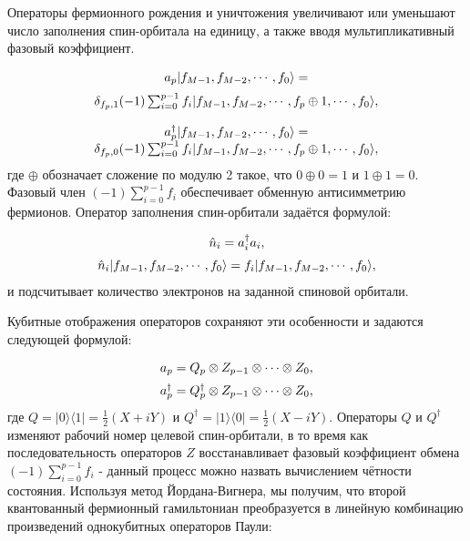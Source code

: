 \documentclass[a4paper]{report}
\begin{document}
Операторы фермионного рождения и уничтожения увеличивают или уменьшают число заполнения спин-орбитала на единицу, а также вводя мультипликативный фазовый коэффициент.

    \begin{equation}\label{}
    \begin{array}{cc}
    \vspace{0,2cm}
    a_p|f_{M-1},f_{M-2},\cdots,f_0\rangle = \\
    \delta_{{f_p},1}(-1)\sum_{i=0}^{p-1}f_i|f_{M-1},f_{M-2},\cdots,f_p\oplus1,\cdots,f_0\rangle, \\
    \\
    a_p^{\dag}|f_{M-1},f_{M-2},\cdots,f_0\rangle = \\
    \delta_{{f_p},0}(-1)\sum_{i=0}^{p-1}f_i|f_{M-1},f_{M-2},\cdots,f_p\oplus1,\cdots,f_0\rangle,
    \nonumber
    \end{array}
    \end{equation}
где ${\oplus}$ обозначает сложение по модулю 2 такое, что ${0\oplus0=1}$ и ${1\oplus1=0}$. Фазовый член ${(-1)\sum_{i=0}^{p-1}f_i}$ обеспечивает обменную антисимметрию фермионов. Оператор заполнения спин-орбитали задаётся формулой:

    \begin{equation}\label{}
    \begin{array}{cc}
    \vspace{0,2cm}
    \hat{n}_i=a_i^{\dag}a_i, \\
    \hat{n}_i|f_{M-1},f_{M-2},\cdots,f_0\rangle=f_i|f_{M-1},f_{M-2},\cdots,f_0\rangle,
    \nonumber
    \end{array}
    \end{equation}
и подсчитывает количество электронов на заданной спиновой орбитали.

Кубитные отображения операторов сохраняют эти особенности и задаются следующей формулой:

    \begin{equation}\label{}
    \begin{array}{cc}
    \vspace{0,2cm}
    a_p=Q_p\otimes Z_{p-1} \otimes \cdots \otimes Z_0, \\
    a_p^{\dag}=Q_p^{\dag} \otimes Z_{p-1} \otimes \cdots \otimes Z_0,
    \nonumber
    \end{array}
    \end{equation}
где ${Q=|0\rangle\langle1|=\frac{1}{2}(X+iY)}$ и ${Q^{\dag}=|1\rangle\langle0|=\frac{1}{2}(X-iY)}$. Операторы ${Q}$ и ${Q^{\dag}}$ изменяют рабочий номер целевой спин-орбитали, в то время как последовательность операторов ${Z}$ восстанавливает фазовый коэффициент обмена ${(-1)\sum_{i=0}^{p-1}f_i}$ - данный процесс можно назвать вычислением чётности состояния. Используя метод Йордана-Вигнера, мы получим, что второй квантованный фермионный гамильтониан преобразуется в линейную комбинацию произведений однокубитных операторов Паули:
\end{document}

